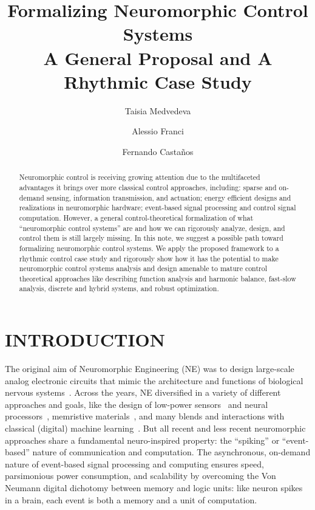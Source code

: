 \documentclass{article}
\title{
Formalizing Neuromorphic Control Systems\\ \Large A General Proposal and A Rhythmic Case Study
}
\author[1]{Taisia Medvedeva}
\author[2]{Alessio Franci}
\author[1]{Fernando Castaños}
\affil[1]{Automatic Control Department, Cinvestav, Mexico}
\affil[2]{Department of Electrical Engineering and Computer Science at the University of Liège, Belgium}
\theoremstyle{definition}
\theoremstyle{remark}
\begin{document}
\maketitle

\begin{abstract}
    
    Neuromorphic control is receiving growing attention due to the multifaceted advantages it brings over more classical control approaches, including: sparse and on-demand sensing, information transmission, and actuation; energy efficient designs and realizations in neuromorphic hardware; event-based signal processing and control signal computation. However, a general control-theoretical formalization of what ``neuromorphic control systems'' are and how we can rigorously analyze, design, and control them is still largely missing. In this note, we suggest a possible path toward formalizing neuromorphic control systems. We apply the proposed framework to a rhythmic control case study and rigorously show how it has the potential to make neuromorphic control systems analysis and design amenable to mature control theoretical approaches like describing function analysis and harmonic balance, fast-slow analysis, discrete and hybrid systems, and robust optimization. 
    
\end{abstract}

\section{INTRODUCTION}

The original aim of Neuromorphic Engineering (NE) was to design large-scale analog electronic circuits that mimic the architecture and functions of biological nervous systems~\cite{mead1990neuromorphic}. Across the years, NE diversified in a variety of different approaches and goals, like the design of low-power sensors~\cite{Lichtsteiner2008dvs} and neural processors~\cite{moradi2017scalable}, memristive materials~\cite{john2022reconfigurable}, and many blends and interactions with classical (digital) machine learning~\cite{yik2025neurobench}. But all recent and less recent neuromorphic approaches share a fundamental neuro-inspired property: the ``spiking'' or ``event-based'' nature of communication and computation. The asynchronous, on-demand nature of event-based signal processing and computing ensures speed, parsimonious power consumption, and scalability by overcoming the Von Neumann digital dichotomy between memory and logic units: like neuron spikes in a brain, each event is both a memory and a unit of computation.
\end{document}

